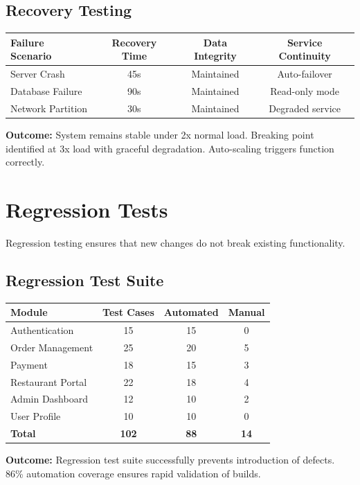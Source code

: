 \documentclass[12pt,a4paper]{report}
\begin{document}
\subsection{Recovery Testing}

\begin{longtable}{|p{3cm}|c|c|c|}
\hline
\textbf{Failure Scenario} & \textbf{Recovery Time} & \textbf{Data Integrity} & \textbf{Service Continuity} \\
\hline
\endfirsthead
Server Crash & 45s & Maintained & Auto-failover \\
\hline
Database Failure & 90s & Maintained & Read-only mode \\
\hline
Network Partition & 30s & Maintained & Degraded service \\
\hline
\end{longtable}

\textbf{Outcome:} System remains stable under 2x normal load. Breaking point identified at 3x load with graceful degradation. Auto-scaling triggers function correctly.

\section{Regression Tests}
Regression testing ensures that new changes do not break existing functionality.

\subsection{Regression Test Suite}

\begin{longtable}{|p{3cm}|c|c|c|}
\hline
\textbf{Module} & \textbf{Test Cases} & \textbf{Automated} & \textbf{Manual} \\
\hline
\endfirsthead
Authentication & 15 & 15 & 0 \\
\hline
Order Management & 25 & 20 & 5 \\
\hline
Payment & 18 & 15 & 3 \\
\hline
Restaurant Portal & 22 & 18 & 4 \\
\hline
Admin Dashboard & 12 & 10 & 2 \\
\hline
User Profile & 10 & 10 & 0 \\
\hline
\textbf{Total} & \textbf{102} & \textbf{88} & \textbf{14} \\
\hline
\end{longtable}

\textbf{Outcome:} Regression test suite successfully prevents introduction of defects. 86\% automation coverage ensures rapid validation of builds.
\end{document}
